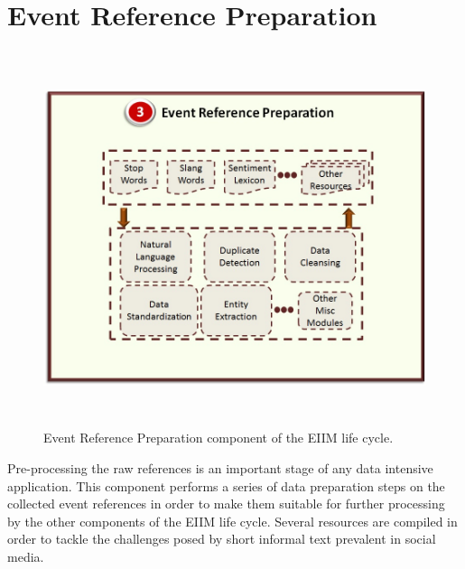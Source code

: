 %
%
%
%
%

\section{Event Reference Preparation}

\begin{figure}[htbp]
  \caption{Event Reference Preparation component of the EIIM life cycle.}
  \centering
    \includegraphics[width=14cm,height=11cm]{Figures/EIIMComponents/EventReferencePreparation.jpg}
\end{figure}

Pre-processing the raw references is an important stage of any data intensive application. This component performs a series of data preparation steps on the collected event references in order to make them suitable for further processing by the other components of the EIIM life cycle. Several resources are compiled in order to tackle the challenges posed by short informal text prevalent in social media. 

